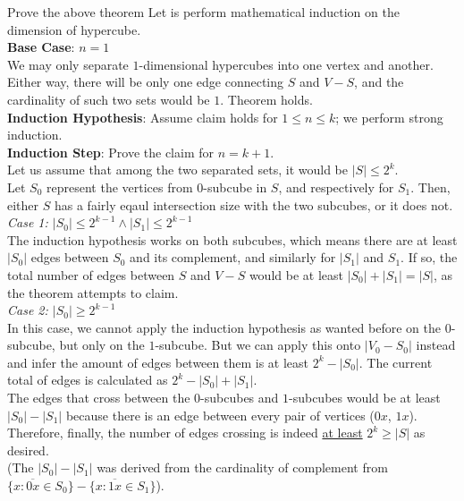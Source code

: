 \begin{ln-quest}{Prove the above theorem}{}
    Let is perform mathematical induction on the dimension of hypercube. \\
    \textbf{Base Case}: $n = 1$ \\
    We may only separate $1$-dimensional hypercubes into one vertex and another. Either way, there will be only one edge connecting $S$ and $V - S$, and the cardinality of such two sets would be $1$. Theorem holds. \\
    \textbf{Induction Hypothesis}: Assume claim holds for $1 \leq n \leq k$; we perform strong induction. \\
    \textbf{Induction Step}: Prove the claim for $n = k + 1$. \\
    Let us assume that among the two separated sets, it would be $|S| \leq 2^k$. \\
    Let $S_0$ represent the vertices from $0$-subcube in $S$, and respectively for $S_1$. Then, either $S$ has a fairly eqaul intersection size with the two subcubes, or it does not. \\
    \textit{Case 1: $|S_0| \leq 2^{k - 1} \land |S_1| \leq 2^{k - 1}$} \\
    The induction hypothesis works on both subcubes, which means there are at least $|S_0|$ edges between $S_0$ and its complement, and similarly for $|S_1|$ and $S_1$. If so, the total number of edges between $S$ and $V - S$ would be at least $|S_0| + |S_1| = |S|$, as the theorem attempts to claim. \\
    \textit{Case 2: $|S_0| \geq 2^{k - 1}$} \\
    In this case, we cannot apply the induction hypothesis as wanted before on the $0$-subcube, but only on the $1$-subcube. But we can apply this onto $|V_0 - S_0|$ instead and infer the amount of edges between them is at least $2^k - |S_0|$. The current total of edges is calculated as $2^k - |S_0| + |S_1|$. \\
    The edges that cross between the $0$-subcubes and $1$-subcubes would be at least $|S_0| - |S_1|$ because there is an edge between every pair of vertices ($0x$, $1x$). Therefore, finally, the number of edges crossing is indeed \underline{at least} $2^k \geq |S|$ as desired. \\
    (The $|S_0| - |S_1|$ was derived from the cardinality of complement from $\{x : \overline{0x} \in S_0\} - \{x : \overline{1x} \in S_1\}$).
\end{ln-quest}

